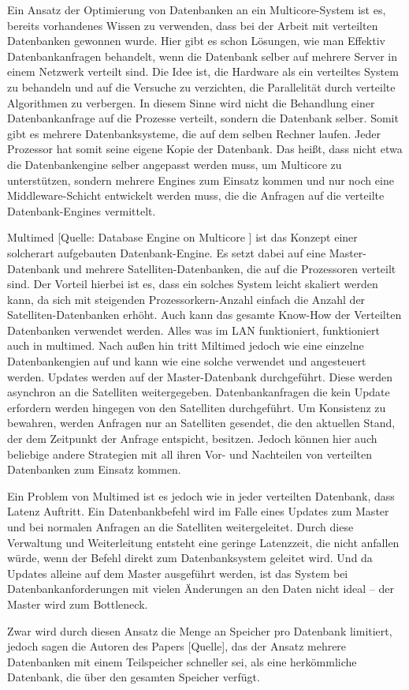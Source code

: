 Ein Ansatz der Optimierung von Datenbanken an ein Multicore-System ist es, bereits vorhandenes Wissen zu verwenden, dass bei der Arbeit mit verteilten Datenbanken gewonnen wurde. Hier gibt es schon Lösungen, wie man Effektiv Datenbankanfragen behandelt, wenn die Datenbank selber auf mehrere Server in einem Netzwerk verteilt sind. Die Idee ist, die Hardware als ein verteiltes System zu behandeln und auf die Versuche zu verzichten, die Parallelität durch verteilte Algorithmen zu verbergen. In diesem Sinne wird nicht die Behandlung einer Datenbankanfrage auf die Prozesse verteilt, sondern die Datenbank selber. Somit gibt es mehrere Datenbanksysteme, die auf dem selben Rechner laufen. Jeder Prozessor hat somit seine eigene Kopie der Datenbank. Das heißt, dass nicht etwa die Datenbankengine selber angepasst werden muss, um Multicore zu unterstützen, sondern mehrere Engines zum Einsatz kommen und nur noch eine Middleware-Schicht entwickelt werden muss, die die Anfragen auf die verteilte Datenbank-Engines vermittelt.

Multimed [Quelle: Database Engine on Multicore ] ist das Konzept einer solcherart aufgebauten Datenbank-Engine. Es setzt dabei auf eine Master-Datenbank und mehrere Satelliten-Datenbanken, die auf die Prozessoren verteilt sind. Der Vorteil hierbei ist es, dass ein solches System leicht skaliert werden kann, da sich mit steigenden Prozessorkern-Anzahl einfach die Anzahl der Satelliten-Datenbanken erhöht. Auch kann das gesamte Know-How der Verteilten Datenbanken verwendet werden. Alles was im LAN funktioniert, funktioniert auch in multimed. Nach außen hin tritt Miltimed jedoch wie eine einzelne Datenbankengien auf und kann wie eine solche verwendet und angesteuert werden. Updates werden auf der Master-Datenbank durchgeführt. Diese werden asynchron an die Satelliten weitergegeben. Datenbankanfragen die kein Update erfordern werden hingegen von den Satelliten durchgeführt. Um Konsistenz zu bewahren, werden Anfragen nur an Satelliten gesendet, die den aktuellen Stand, der dem Zeitpunkt der Anfrage entspicht, besitzen. Jedoch können hier auch beliebige andere Strategien mit all ihren Vor- und Nachteilen von verteilten Datenbanken zum Einsatz kommen.

Ein Problem von Multimed ist es jedoch wie in jeder verteilten Datenbank, dass Latenz Auftritt. Ein Datenbankbefehl wird im Falle eines Updates zum Master und bei normalen Anfragen an die Satelliten weitergeleitet. Durch diese Verwaltung und Weiterleitung entsteht eine geringe Latenzzeit, die nicht anfallen würde, wenn der Befehl direkt zum Datenbanksystem geleitet wird. Und da Updates alleine auf dem Master ausgeführt werden, ist das System bei Datenbankanforderungen mit vielen Änderungen an den Daten nicht ideal – der Master wird zum Bottleneck.

Zwar wird durch diesen Ansatz die Menge an Speicher pro Datenbank limitiert, jedoch sagen die Autoren des Papers [Quelle], das der Ansatz mehrere Datenbanken mit einem Teilspeicher schneller sei, als eine herkömmliche Datenbank, die über den gesamten Speicher verfügt.